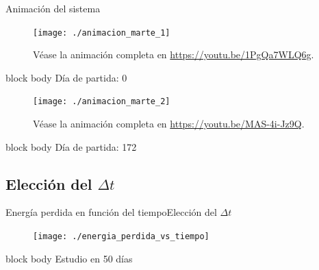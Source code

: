 \documentclass{beamer}
\begin{document}
            \begin{frame}{Animación del sistema}{}
                \vspace*{-0.3cm}
                \begin{minipage}[t]{0.49\textwidth}
                    \begin{figure}[H!]
                        \texttt{[image: ./animacion\_marte\_1]}
                        \caption*{Véase la animación completa en \url{https://youtu.be/1PgQa7WLQ6g}.}
                        \label{fig:marte_1}
                    \end{figure}
                    \vspace*{-0.5cm}
                    \begin{beamercolorbox}[sep=5pt,center]{block body}
                        \centering
                        \small{Día de partida: 0}
                    \end{beamercolorbox}
                \end{minipage}
                \hfill
                \begin{minipage}[t]{0.49\textwidth}
                    \begin{figure}[H!]
                        \texttt{[image: ./animacion\_marte\_2]}
                        \caption*{Véase la animación completa en \url{https://youtu.be/MAS-4i-Jz9Q}.}
                        \label{fig:marte_2}
                    \end{figure}
                    \vspace*{-0.5cm}
                    \begin{beamercolorbox}[sep=5pt,center]{block body}
                        \centering
                        \small{Día de partida: 172}
                    \end{beamercolorbox}
                \end{minipage}
            \end{frame}

        \subsection{Elección del $\Delta t$}

            \begin{frame}{Energía perdida en función del tiempo}{Elección del $\Delta t$}
                    \begin{figure}[H!]
                        \texttt{[image: ./energia\_perdida\_vs\_tiempo]}
                        \label{fig:marte_3}
                    \end{figure}
                    \begin{beamercolorbox}[sep=5pt,center]{block body}
                        \centering
                        \small{Estudio en 50 días}
                    \end{beamercolorbox}
            \end{frame}
\end{document}
